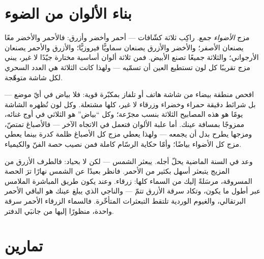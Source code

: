 \section{بناء الألوان من الضوء}

\begin{example}\label{ex:g8:colors-spectra:additive}
مزج \emph{الأضواء} جمع. راكِب ثلاثة كشّافات --- أحمر وأخضر
وأزرق: فالأحمر والأخضر معًا يصنعان الأصفر؛ والأخضر والأزرق
يصنعان سماويًّا فيروزيًّا؛ والأزرق والأحمر يصنعان الأرجواني؛
والثلاثة جميعًا تصنع الأبيض. فمن ثلاثة ألوان أساسية مختارة
جيّدًا لا غير، يبني مزج  تقريبًا كل لون تستطيع العين أن
تسمّيه --- ولهذا كانت الثلاثة هي العدد السحري لكل شاشة
متوهّجة.
\end{example}

\begin{example}\label{ex:g8:colors-spectra:screen}
افحص منطقة بيضاء من شاشة هاتف أو تلفاز بمكبّرة قوية: فلا بياض
في أيّ موضع --- بل شرائط دقيقة حمراء وخضراء وزرقاء لا غير،
كلها مشتعلة. وكل لون تُظهره الشاشة يومًا هو هذه المصابيح
الثلاثة بنسب مجرّعة؛ وكل ``بياض'' هو الثلاثي في أوج غنائه،
ممزوجًا بمسافة عينك. أما علبة الألوان فتعمل في الاتجاه الآخر
--- فالأصباغ تمتصّ، ومزجها يطرح  بدل أن يجمعه --- ولهذا
يعطي مزج كل الأصباغ ظلمة كدرة بينما يعطي مزج كل الأضواء
بياضًا؛ وأمّا حكاية الرسّام كاملة فمن نصيب حصة الفنّ
والكيمياء.
\end{example}

\begin{remark}\label{rem:g8:colors-spectra:sunset}
وعد  في السنة الماضية يحلّ أجله.  يبعثر  الشمس
--- لكن لا بحياد: فالطرف الأزرق من المزيج يتبعثر أسهل بكثير من
الأحمر. فانظر بعيدًا عن الشمس نهارًا ترَ الحصة المسروقة،
مرسَلةً إليك من السماء كلها: زرقاء. وعند  يكون طريق
 المباشرة الملامس عبر  أطول ما يكون، وتكاد سرقة
الأزرق تتمّ --- والناجي الذي يبلغ عينك هو الباقي الأحمر
البرتقالي، والغيوم الوردية تلتقط التبعثرات المتأخّرة. فالسماء
الزرقاء  الأحمر سرقة واحدة، منظورًا إليها من جانبَي
الدفتر.
\end{remark}

\section{تمارين}

